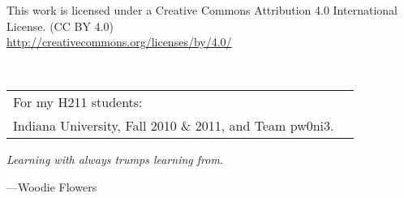\documentclass[nols]{tufte-book}
\newcommand{\blankpage}{\newpage\hbox{}\thispagestyle{empty}\newpage} %
\begin{document}
\begin{schemeregion}
\begin{fullwidth}
\noindent
\huge
\ccLogo
\ccAttribution
\large

\noindent
This work is licensed under a Creative Commons Attribution 4.0 International License.
(CC BY 4.0) \\
\url{http://creativecommons.org/licenses/by/4.0/}
\normalsize
\end{fullwidth}


\tableofcontents



\cleardoublepage
\thispagestyle{empty}
\begin{fullwidth}
~\vfill
\begin{doublespace}
\noindent\fontsize{18}{22}\selectfont\itshape
\nohyphenation
\begin{tabular}{ll}
For my H211 students: \\ Indiana University, Fall 2010 \& 2011, and Team pw0ni3.
\end{tabular}
\end{doublespace}
\begin{flushright}
\Large
\textit{Learning with always trumps learning from.}

\wspace

---Woodie Flowers
\normalsize
\end{flushright}
\vfill
\vfill
\end{fullwidth}


\blankpage




\mainmatter



%

%








\backmatter






\printindex %

\end{schemeregion}
\end{document}
